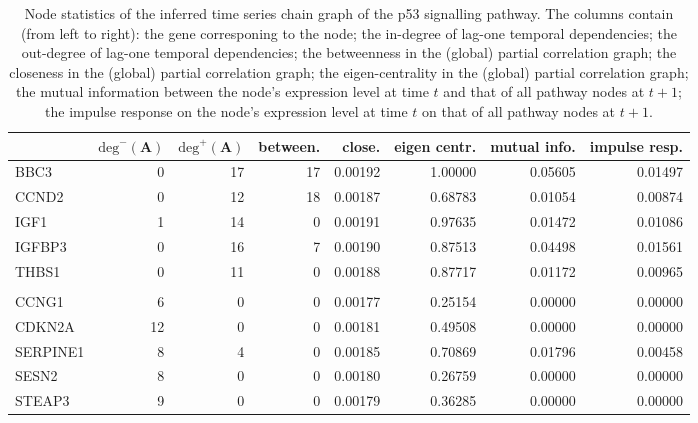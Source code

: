 \documentclass[a4paper]{article}
\begin{document}
\begin{table}[b!] \label{table:postEst}
\begin{center}
\begin{tabular}{lrrrrrrr}
\hline
&	$\mbox{deg}^- (\mathbf{A})$	&	$\mbox{deg}^+ (\mathbf{A})$	&	between. 	&	close.	&	eigen centr.	&	mutual info.	&	impulse resp.	\\
\hline
BBC3	&	0	&	17	&	17	&	0.00192	&	1.00000	&	0.05605	&	0.01497	\\
CCND2	&	0	&	12	&	18	&	0.00187	&	0.68783	&	0.01054	&	0.00874	\\
IGF1	&	1	&	14	&	0	&	0.00191	&	0.97635	&	0.01472	&	0.01086	\\
IGFBP3	&	0	&	16	&	7	&	0.00190	&	0.87513	&	0.04498	&	0.01561	\\
THBS1	&	0	&	11	&	0	&	0.00188	&	0.87717	&	0.01172	&	0.00965	\\
	&		&		&		&		&		&		&		\\
CCNG1	&	6	&	0	&	0	&	0.00177	&	0.25154	&	0.00000	&	0.00000	\\
CDKN2A	&	12	&	0	&	0	&	0.00181	&	0.49508	&	0.00000	&	0.00000	\\
SERPINE1	&	8	&	4	&	0	&	0.00185	&	0.70869	&	0.01796	&	0.00458	\\
SESN2	&	8	&	0	&	0	&	0.00180	&	0.26759	&	0.00000	&	0.00000	\\
STEAP3	&	9	&	0	&	0	&	0.00179	&	0.36285	&	0.00000	&	0.00000	\\
\hline
\end{tabular}
\end{center}
\caption{Node statistics of the inferred time series chain graph of the p53 signalling pathway. The columns contain (from left to right): the gene corresponing to the node; the in-degree of lag-one temporal dependencies; the out-degree of lag-one temporal dependencies; the betweenness in the (global) partial correlation graph; the closeness in the (global) partial correlation graph; the eigen-centrality in the (global) partial correlation graph; the mutual information between the node's expression level at time $t$ and that of all pathway nodes at $t+1$; the impulse response on the node's expression level at time $t$ on that of all pathway nodes at $t+1$.}
\end{table}
\end{document}
